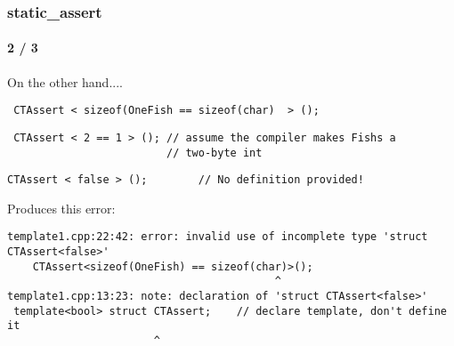 \begin{frame}[fragile,t]
\frametitle{static\_assert}
\framesubtitle{2 / 3}

On the other hand....
{\scriptsize\begin{verbatim}
 CTAssert < sizeof(OneFish == sizeof(char)  > (); 
\end{verbatim}
}
\pause
{\scriptsize\begin{verbatim}
 CTAssert < 2 == 1 > (); // assume the compiler makes Fishs a
                         // two-byte int
\end{verbatim}
}
\pause
{\scriptsize\begin{verbatim}
CTAssert < false > ();        // No definition provided!
\end{verbatim}
}
\pause
Produces this error:
{\scriptsize\begin{verbatim}
template1.cpp:22:42: error: invalid use of incomplete type 'struct CTAssert<false>'
    CTAssert<sizeof(OneFish) == sizeof(char)>();
                                          ^
template1.cpp:13:23: note: declaration of 'struct CTAssert<false>'
 template<bool> struct CTAssert;    // declare template, don't define it
                       ^
\end{verbatim}
}

\end{frame}


